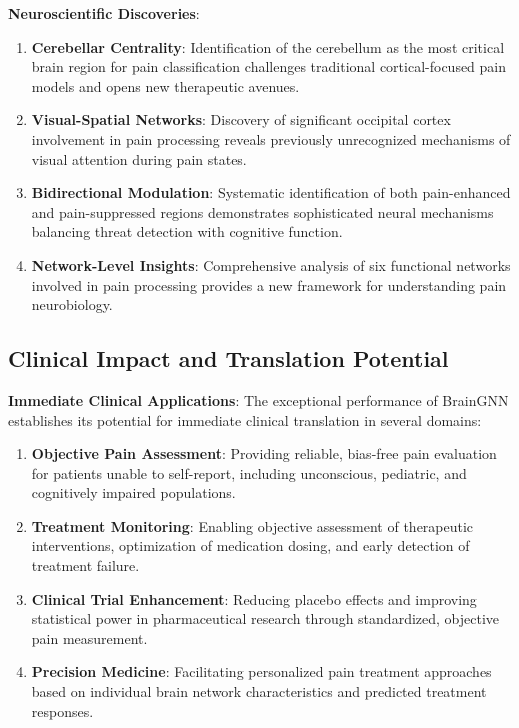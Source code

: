 \documentclass[10pt,journal,compsoc]{IEEEtran}
\begin{document}
\textbf{Neuroscientific Discoveries}:
\begin{enumerate}
\item \textbf{Cerebellar Centrality}: Identification of the cerebellum as the most critical brain region for pain classification challenges traditional cortical-focused pain models and opens new therapeutic avenues.

\item \textbf{Visual-Spatial Networks}: Discovery of significant occipital cortex involvement in pain processing reveals previously unrecognized mechanisms of visual attention during pain states.

\item \textbf{Bidirectional Modulation}: Systematic identification of both pain-enhanced and pain-suppressed regions demonstrates sophisticated neural mechanisms balancing threat detection with cognitive function.

\item \textbf{Network-Level Insights}: Comprehensive analysis of six functional networks involved in pain processing provides a new framework for understanding pain neurobiology.
\end{enumerate}

\subsection{Clinical Impact and Translation Potential}

\textbf{Immediate Clinical Applications}:
The exceptional performance of BrainGNN establishes its potential for immediate clinical translation in several domains:

\begin{enumerate}
\item \textbf{Objective Pain Assessment}: Providing reliable, bias-free pain evaluation for patients unable to self-report, including unconscious, pediatric, and cognitively impaired populations.

\item \textbf{Treatment Monitoring}: Enabling objective assessment of therapeutic interventions, optimization of medication dosing, and early detection of treatment failure.

\item \textbf{Clinical Trial Enhancement}: Reducing placebo effects and improving statistical power in pharmaceutical research through standardized, objective pain measurement.

\item \textbf{Precision Medicine}: Facilitating personalized pain treatment approaches based on individual brain network characteristics and predicted treatment responses.
\end{enumerate}
\end{document}
